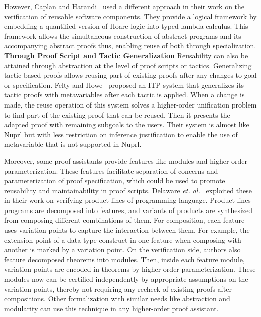 However, Caplan and Harandi~\cite{Caplan_Harandi_1995} used a different approach in their work on the verification of reusable software components. They provide a logical framework by embedding a quantified version of Hoare logic into typed lambda calculus. This framework allows the simultaneous construction of abstract programs and its accompanying abstract proofs thus, enabling reuse of both through specialization. \\

\textbf{Through Proof Script and Tactic Generalization} Reusability can also be attained through abstraction at the level of proof scripts or tactics. Generalizing tactic based proofs allows reusing part of existing proofs after any changes to goal or specification. Felty and Howe~\cite{Felty_Howe_1994} proposed an ITP system that generalizes its tactic proofs with metavariables after each tactic is applied. When a change is made, the reuse operation of this system solves a higher-order unification problem to find part of the existing proof that can be reused. Then it presents the adapted proof with remaining subgoals to the users. Their system is almost like Nuprl but with less restriction on inference justification to enable the use of metavariable that is not supported in Nuprl. 

Moreover, some proof assistants provide features like modules and higher-order parameterization. These features facilitate separation of concerns and parameterization of proof specification, which could be used to promote reusability and maintainability in proof scripts. Delaware \emph{et. al.}~\cite{Delaware_et_al_2011} exploited these in their work on verifying product lines of programming language. Product lines programs are decomposed into features, and variants of products are synthesized from composing different combinations of them. For composition, each feature uses variation points to capture the interaction between them. For example, the extension point of a data type construct in one feature when composing with another is marked by a variation point. On the verification side, authors also feature decomposed theorems into modules. Then, inside each feature module, variation points are encoded in theorems by higher-order parameterization. These modules now can be certified independently by appropriate assumptions on the variation points, thereby not requiring any recheck of existing proofs after compositions. Other formalization with similar needs like abstraction and modularity can use this technique in any higher-order proof assistant. \\

